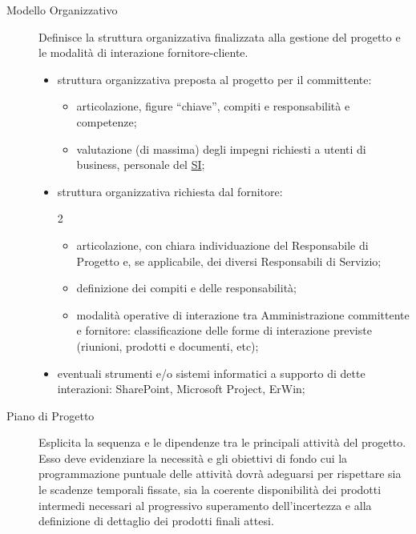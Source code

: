 \begin{description}
    \item[Modello Organizzativo] Definisce la struttura organizzativa finalizzata alla gestione del progetto e le modalità di interazione fornitore-cliente.
        \begin{itemize}
            \item struttura organizzativa preposta al progetto per il committente:
                \begin{itemize}
                    \item articolazione, figure ``chiave'', compiti e responsabilità e competenze;
                    \item valutazione (di massima) degli impegni richiesti a utenti di business, personale del \hyperref[sub:il_sistema_informativo]{SI};
                \end{itemize}
            \item struttura organizzativa richiesta dal fornitore:
                \begin{multicols}{2}
                    \begin{itemize}
                    \item articolazione, con chiara individuazione del Responsabile di Progetto e, se applicabile, dei diversi Responsabili di Servizio;
                    \item definizione dei compiti e delle responsabilità;
                    \item modalità operative di interazione tra Amministrazione committente e fornitore: classificazione delle forme di interazione previste (riunioni, prodotti e documenti, etc);
                    \end{itemize}
                \end{multicols}
            \item eventuali strumenti e/o sistemi informatici a supporto di dette interazioni: SharePoint, Microsoft Project, ErWin;
        \end{itemize}
    \item[Piano di Progetto] Esplicita la sequenza e le dipendenze tra le principali attività del progetto.
        Esso deve evidenziare la necessità e gli obiettivi di fondo cui la programmazione puntuale delle attività dovrà adeguarsi per rispettare sia le scadenze temporali fissate, sia la coerente disponibilità dei prodotti intermedi necessari al progressivo superamento dell'incertezza e alla definizione di dettaglio dei prodotti finali attesi.
        \begin{itemize}

\end{itemize}
\end{description}
